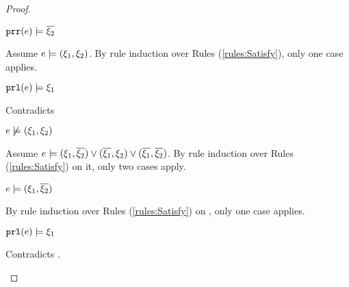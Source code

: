 \begin{proof}
\begin{byCases}
\begin{byCases}
\begin{byCases}
\begin{pfsteps*}
            \item $\mathtt{prr}(e) \models \overline{\xi_2}$  
            \end{pfsteps*}
            Assume $e \models (\xi_1 , \xi_2)$. By rule induction over Rules (\ref{rules:Satisfy}), only one case applies.
            \begin{byCases}
            \item[\text{(\ref{rule:CSNotValPair})}]
                \begin{pfsteps*}
                \item $\mathtt{prl}(e) \models \xi_1$ 
                \end{pfsteps*}
                Contradicts 
            \end{byCases}
            \begin{pfsteps*}
            \item $e \not\models (\xi_1 , \xi_2)$  
            \end{pfsteps*}
            Assume $e \models (\xi_1 , \overline{\xi_2}) \vee (\overline{\xi_1} , \xi_2) \vee (\overline{\xi_1} , \overline{\xi_2})$. By rule induction over Rules (\ref{rules:Satisfy}) on it, only two cases apply.
            \begin{byCases}
            \item[\text{(\ref{rule:CSOr1})}]
                \begin{pfsteps*}
                \item $e \models (\xi_1 , \overline{\xi_2})$  
                \end{pfsteps*}
                By rule induction over Rules (\ref{rules:Satisfy}) on , only one case applies.
                \begin{byCases}
                \item[\text{(\ref{rule:CSNotValPair})}]
                    \begin{pfsteps*}
                    \item $\mathtt{prl}(e) \models \xi_1$ 
                    \end{pfsteps*}
                    Contradicts .
                \end{byCases}
            \item[\text{(\ref{rule:CSOr2})}]

\end{byCases}
\end{byCases}
\end{byCases}
\end{byCases}
\end{proof}
